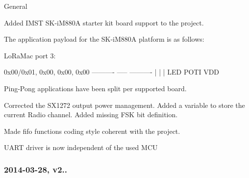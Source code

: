 \begin{DoxyItemize}
\item General
\begin{DoxyEnumerate}
\item Added I\+M\+ST S\+K-\/i\+M880A starter kit board support to the project.
\begin{DoxyItemize}
\item The application payload for the S\+K-\/i\+M880A platform is as follows\+:
\end{DoxyItemize}

Lo\+Ra\+Mac port 3\+: \begin{DoxyVerb} { 0x00/0x01, 0x00, 0x00, 0x00 }
  ----------  ----- ----------
       |        |       |
      LED     POTI     VDD
\end{DoxyVerb}

\item Ping-\/\+Pong applications have been split per supported board.
\item Corrected the S\+X1272 output power management. Added a variable to store the current Radio channel. Added missing F\+SK bit definition.
\item Made fifo functions coding style coherent with the project.
\item U\+A\+RT driver is now independent of the used M\+CU
\end{DoxyEnumerate}
\end{DoxyItemize}

\subsubsection*{2014-\/03-\/28, v2..}


